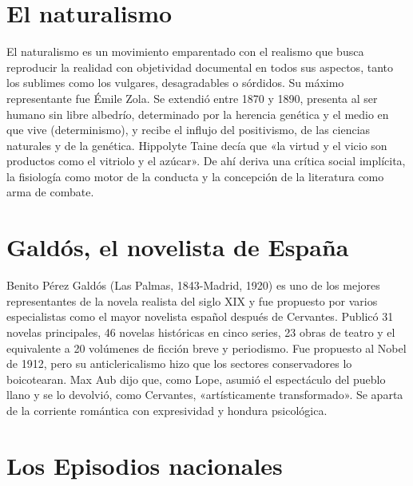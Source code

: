 \documentclass{book}
\begin{document}

\section{El naturalismo}

El naturalismo es un movimiento emparentado con el realismo que busca reproducir la realidad con objetividad documental en todos sus aspectos, tanto los sublimes como los vulgares, desagradables o sórdidos. Su máximo representante fue Émile Zola. Se extendió entre 1870 y 1890, presenta al ser humano sin libre albedrío, determinado por la herencia genética y el medio en que vive (determinismo), y recibe el influjo del positivismo, de las ciencias naturales y de la genética. Hippolyte Taine decía que «la virtud y el vicio son productos como el vitriolo y el azúcar». De ahí deriva una crítica social implícita, la fisiología como motor de la conducta y la concepción de la literatura como arma de combate.


\section{Galdós, el novelista de España}

Benito Pérez Galdós (Las Palmas, 1843-Madrid, 1920) es uno de los mejores representantes de la novela realista del siglo XIX y fue propuesto por varios especialistas como el mayor novelista español después de Cervantes. Publicó 31 novelas principales, 46 novelas históricas en cinco series, 23 obras de teatro y el equivalente a 20 volúmenes de ficción breve y periodismo. Fue propuesto al Nobel de 1912, pero su anticlericalismo hizo que los sectores conservadores lo boicotearan. Max Aub dijo que, como Lope, asumió el espectáculo del pueblo llano y se lo devolvió, como Cervantes, «artísticamente transformado». Se aparta de la corriente romántica con expresividad y hondura psicológica.


\section{Los Episodios nacionales}
\end{document}
